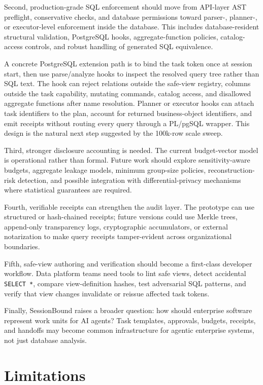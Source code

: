 \documentclass[journal]{IEEEtran}
\begin{document}
Second, production-grade SQL enforcement should move from
API-layer AST preflight, conservative checks, and database permissions
toward parser-, planner-, or executor-level enforcement inside the
database. This includes database-resident structural validation,
PostgreSQL hooks, aggregate-function policies, catalog-access controls,
and robust handling of generated SQL equivalence.

A concrete PostgreSQL extension path is to bind the task token once at
session start, then use parse/analyze hooks to inspect the resolved query
tree rather than SQL text. The hook can reject relations outside the
safe-view registry, columns outside the task capability, mutating
commands, catalog access, and disallowed aggregate functions after name
resolution. Planner or executor hooks can attach task identifiers to the
plan, account for returned business-object identifiers, and emit receipts
without routing every query through a PL/pgSQL wrapper. This design is
the natural next step suggested by the 100k-row scale sweep.

Third, stronger disclosure accounting is needed. The current
budget-vector model is operational rather than formal. Future work
should explore sensitivity-aware budgets, aggregate leakage models,
minimum group-size policies, reconstruction-risk detection, and possible
integration with differential-privacy mechanisms where statistical
guarantees are required.

Fourth, verifiable receipts can strengthen the audit layer. The
prototype can use structured or hash-chained receipts; future versions
could use Merkle trees, append-only transparency logs, cryptographic
accumulators, or external notarization to make query receipts
tamper-evident across organizational boundaries.

Fifth, safe-view authoring and verification should become a
first-class developer workflow. Data platform teams need tools to lint
safe views, detect accidental \texttt{SELECT\ *}, compare
view-definition hashes, test adversarial SQL patterns, and verify that
view changes invalidate or reissue affected task tokens.

Finally, SessionBound raises a broader question: how should enterprise
software represent work units for AI agents? Task templates, approvals,
budgets, receipts, and handoffs may become common infrastructure for
agentic enterprise systems, not just database analysis.


\hypertarget{limitations}{%
\section{Limitations}\label{limitations}}
\end{document}
